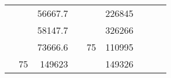 \begin{table}[H]
\begin{tabular}{|ccrccrccc}
\multicolumn{1}{|c|}{\cellcolor[HTML]{FFFFC7}}                                & \multicolumn{1}{c|}{\cellcolor[HTML]{DAE8FC}}                      & \multicolumn{1}{r|}{\cellcolor[HTML]{DAE8FC}56667.7}   & \multicolumn{1}{c|}{\cellcolor[HTML]{FFFFC7}}                                & \multicolumn{1}{c|}{\cellcolor[HTML]{DAE8FC}}                       & \multicolumn{1}{r|}{\cellcolor[HTML]{DDFDFF}226845}    &                                                                              &                                                                    &                                                        \\ \cline{3-3} \cline{6-6}
\multicolumn{1}{|c|}{\cellcolor[HTML]{FFFFC7}}                                & \multicolumn{1}{c|}{\cellcolor[HTML]{DAE8FC}}                      & \multicolumn{1}{r|}{\cellcolor[HTML]{DDFDFF}58147.7}   & \multicolumn{1}{c|}{\cellcolor[HTML]{FFFFC7}}                                & \multicolumn{1}{c|}{\cellcolor[HTML]{DAE8FC}}                       & \multicolumn{1}{r|}{\cellcolor[HTML]{DAE8FC}326266}    &                                                                              &                                                                    &                                                        \\ \cline{3-3} \cline{6-6}
\multicolumn{1}{|c|}{\cellcolor[HTML]{FFFFC7}}                                & \multicolumn{1}{c|}{\cellcolor[HTML]{DAE8FC}}                      & \multicolumn{1}{r|}{\cellcolor[HTML]{DAE8FC}73666.6}   & \multicolumn{1}{c|}{\cellcolor[HTML]{FFFFC7}}                                & \multicolumn{1}{c|}{\multirow{-10}{*}{\cellcolor[HTML]{DAE8FC}75}}  & \multicolumn{1}{r|}{\cellcolor[HTML]{DDFDFF}110995}    &                                                                              &                                                                    &                                                        \\ \cline{3-3} \cline{5-6}
\multicolumn{1}{|c|}{\cellcolor[HTML]{FFFFC7}}                                & \multicolumn{1}{c|}{\multirow{-10}{*}{\cellcolor[HTML]{DAE8FC}75}} & \multicolumn{1}{r|}{\cellcolor[HTML]{DDFDFF}149623}    & \multicolumn{1}{c|}{\cellcolor[HTML]{FFFFC7}}                                & \multicolumn{1}{c|}{\cellcolor[HTML]{DDFDFF}}                       & \multicolumn{1}{r|}{\cellcolor[HTML]{DAE8FC}149326}    &                                                                              &                                                                    &                                                        \\ \cline{2-3} \cline{6-6}

\end{tabular}
\end{table}
